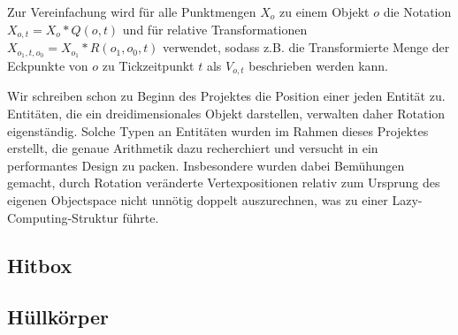Zur Vereinfachung wird für alle Punktmengen $X_o$ zu einem Objekt $o$ die Notation $X_{o, t} = X_o * Q(o, t)$ und für relative Transformationen $X_{o_1, t, o_0} = X_{o_1} * R(o_1, o_0, t)$ verwendet, sodass z.B. die Transformierte Menge der Eckpunkte von $o$ zu Tickzeitpunkt $t$ als $V_{o,t}$ beschrieben werden kann.

Wir schreiben schon zu Beginn des Projektes die Position einer jeden Entität zu. Entitäten, die ein dreidimensionales Objekt darstellen, verwalten daher Rotation eigenständig. Solche Typen an Entitäten wurden im Rahmen dieses Projektes erstellt, die genaue Arithmetik dazu recherchiert und versucht in ein performantes Design zu packen. Insbesondere wurden dabei Bemühungen gemacht, durch Rotation veränderte Vertexpositionen relativ zum Ursprung des eigenen Objectspace nicht unnötig doppelt auszurechnen, was zu einer Lazy-Computing-Struktur führte.

\subsection{Hitbox}

\subsection{Hüllkörper}


